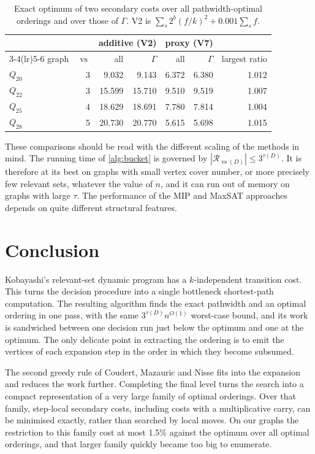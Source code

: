 \documentclass[11pt]{article}
\theoremstyle{definition}
\newcommand{\vs}{\operatorname{vs}}
\newcommand{\Rel}{\mathcal{R}}
\begin{document}
\begin{table}[ht]
\centering
\small
\begin{tabular}{lrrrrrr}
\toprule
& & \multicolumn{2}{c}{additive (V2)} & \multicolumn{2}{c}{proxy (V7)} & \\
\cmidrule(lr){3-4}\cmidrule(lr){5-6}
graph & $\vs$ & all & $\Gamma$ & all & $\Gamma$ & largest ratio\\
\midrule
$Q_{20}$ & 3 & 9.032 & 9.143 & 6.372 & 6.380 & 1.012\\
$Q_{22}$ & 3 & 15.599 & 15.710 & 9.510 & 9.519 & 1.007\\
$Q_{25}$ & 4 & 18.629 & 18.691 & 7.780 & 7.814 & 1.004\\
$Q_{28}$ & 5 & 20.730 & 20.770 & 5.615 & 5.698 & 1.015\\
\bottomrule
\end{tabular}
\caption{Exact optimum of two secondary costs over all pathwidth-optimal
orderings and over those of $\Gamma$. V2 is
$\sum_s 2^{b}(f/k)^2+0.001\sum_s f$.}\label{tab:gammaloss}
\end{table}

These comparisons should be read with the different scaling of the methods
in mind. The running time of \cref{alg:bucket} is governed by
$|\Rel_{\vs(D)}|\le 3^{\tau(D)}$. It is therefore at its best on graphs with
small vertex cover number, or more precisely few relevant sets, whatever the
value of $n$, and it can run out of memory on graphs with large $\tau$. The
performance of the MIP and MaxSAT approaches depends on quite different
structural features.

\FloatBarrier
\section{Conclusion}

Kobayashi's relevant-set dynamic program has a $k$-independent transition
cost. This turns the decision procedure into a single bottleneck
shortest-path computation. The resulting algorithm finds the exact pathwidth
and an optimal ordering in one pass, with the same $3^{\tau(D)}n^{O(1)}$
worst-case bound, and its work is sandwiched between one decision run just
below the optimum and one at the optimum. The only delicate point in
extracting the ordering is to emit the vertices of each expansion step in
the order in which they become subsumed.

The second greedy rule of Coudert, Mazauric and Nisse fits into the
expansion and reduces the work further. Completing the final level turns
the search into a compact representation of a very large family of optimal
orderings. Over that family, step-local secondary costs, including costs
with a multiplicative carry, can be minimised exactly, rather than searched
by local moves. On our graphs the restriction to this family cost at most
1.5\% against the optimum over all optimal orderings, and that larger family
quickly became too big to enumerate.
\end{document}
